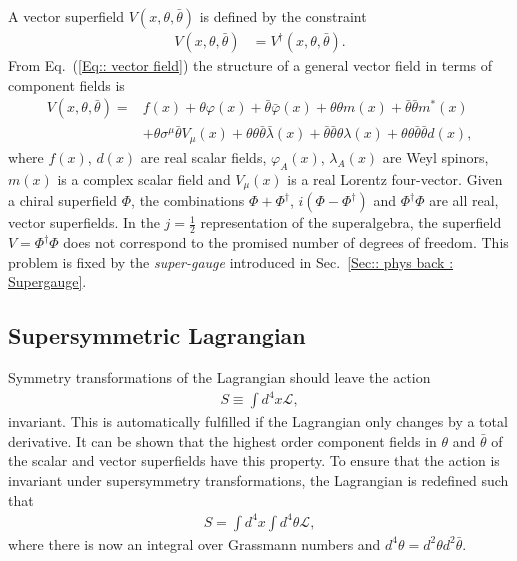 \documentclass[twoside,english]{uiofysmaster}
\begin{document}
A vector superfield $V(x, \theta, \bar{\theta})$ is defined by the constraint
\begin{align}
V (x, \theta, \bar{\theta}) &= V^{\dagger} (x, \theta, \bar{\theta}).\label{Eq:: vector field}
\end{align}
From Eq.\ (\ref{Eq:: vector field}) the structure of a general vector field in terms of component fields is \cite{martin2010supersymmetry}
\begin{align}
V (x, \theta, \bar{\theta}) =& f(x) + \theta \varphi (x) + \bar{\theta} \bar{\varphi} (x) + \theta \theta m(x) + \bar{\theta} \bar{\theta} m^* (x) \nonumber \\
&+ \theta \sigma^{\mu} \bar{\theta} V_{\mu} (x) + \theta \theta \bar{\theta} \bar{\lambda} (x) + \bar{\theta} \bar{\theta} \theta \lambda (x) + \theta \theta \bar{\theta} \bar{\theta} d(x),
\end{align}
where $f(x)$, $d(x)$ are real scalar fields, $\varphi_A (x)$, $\lambda_A (x)$ are Weyl spinors, $m(x)$ is a complex scalar field and $V_{\mu} (x)$ is a real Lorentz four-vector. Given a chiral superfield $\Phi$, the combinations $\Phi + \Phi^{\dagger}$, $i (\Phi - \Phi^{\dagger})$ and $\Phi^{\dagger} \Phi$ are all real, vector superfields. In the $j = \frac{1}{2}$ representation of the superalgebra, the superfield $V = \Phi^{\dagger} \Phi$ does not correspond to the promised number of degrees of freedom. This problem is fixed by the \textit{super-gauge} introduced in Sec.~\ref{Sec:: phys back : Supergauge}. 



\subsection{Supersymmetric Lagrangian}

Symmetry transformations of the Lagrangian should leave the action
\begin{align}
S \equiv \int d^4x \mathcal{L},
\end{align}
 invariant. This is automatically fulfilled if the Lagrangian only changes by a total derivative. It can be shown that the highest order component fields in $\theta$ and $\bar{\theta}$ of the scalar and vector superfields have this property. To ensure that the action is invariant under supersymmetry transformations, the Lagrangian is redefined such that
\begin{align}
S = \int d^4x \int d^4 \theta \mathcal{L},
\end{align}
where there is now an integral over Grassmann numbers and $d^4 \theta = d^2 \theta d^2 \bar{\theta}$.
\end{document}
